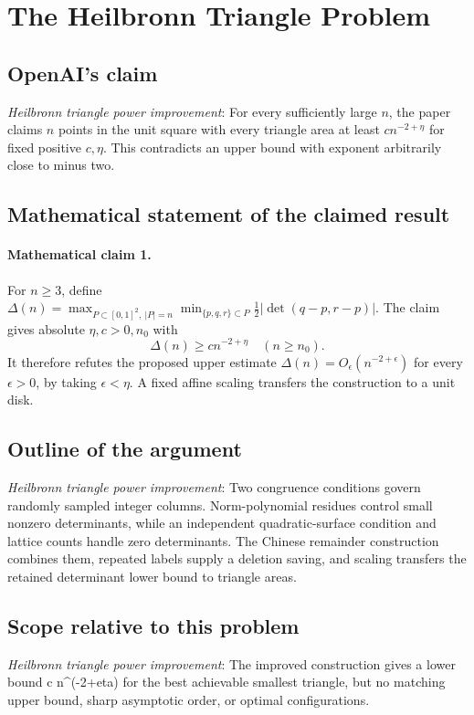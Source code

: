 \documentclass[11pt]{article}
\begin{document}
\section*{The Heilbronn Triangle Problem}

\subsection{OpenAI's claim}
\textit{Heilbronn triangle power improvement}: For every sufficiently large $n$, the paper claims $n$ points in the unit square with every triangle area at least $c n^{-2+\eta}$ for fixed positive $c,\eta$. This contradicts an upper bound with exponent arbitrarily close to minus two.

\subsection{Mathematical statement of the claimed result}
\paragraph{Mathematical claim 1.} For $n\ge3$, define $\Delta(n)=\max_{P\subset[0,1]^2,\ |P|=n}\min_{\{p,q,r\}\subset P}\tfrac12|\det(q-p,r-p)|$. The claim gives absolute $\eta,c>0,n_0$ with \[\Delta(n)\ge cn^{-2+\eta}\quad(n\ge n_0).\] It therefore refutes the proposed upper estimate $\Delta(n)=O_\epsilon(n^{-2+\epsilon})$ for every $\epsilon>0$, by taking $\epsilon<\eta$. A fixed affine scaling transfers the construction to a unit disk.

\subsection{Outline of the argument}
\textit{Heilbronn triangle power improvement}: Two congruence conditions govern randomly sampled integer columns. Norm-polynomial residues control small nonzero determinants, while an independent quadratic-surface condition and lattice counts handle zero determinants. The Chinese remainder construction combines them, repeated labels supply a deletion saving, and scaling transfers the retained determinant lower bound to triangle areas.

\subsection{Scope relative to this problem}
\textit{Heilbronn triangle power improvement}: The improved construction gives a lower bound c n\textasciicircum{}(-2+eta) for the best achievable smallest triangle, but no matching upper bound, sharp asymptotic order, or optimal configurations.
\end{document}

